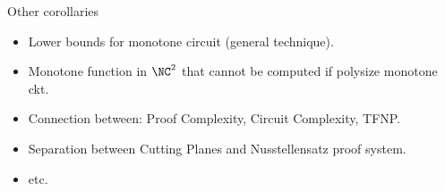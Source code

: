 \begin{frame}{Other corollaries}

    \begin{itemize}
        \item Lower bounds for monotone circuit (\alert{general technique}).
        \item Monotone function in $\NC^2$ that cannot be computed if polysize monotone ckt.
        \item Connection between: Proof Complexity, Circuit Complexity, TFNP.
        \item Separation between Cutting Planes and Nusstellensatz proof system.
        \item etc.
    \end{itemize}
\end{frame}


